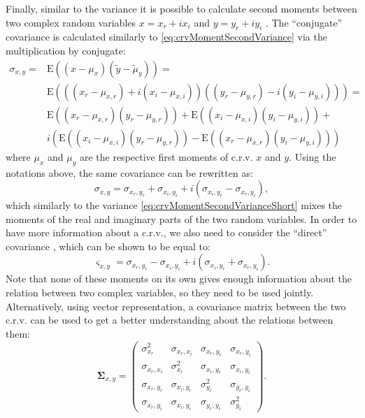 \documentclass[
]{book}
\begin{document}
Finally, similar to the variance it is possible to calculate second moments between two complex random variables \(x = x_r+i x_i\) and \(y = y_r + i y_i\) \citep{Picinbono}. The ``conjugate'' covariance is calculated similarly to \eqref{eq:crvMomentSecondVariance} via the multiplication by conjugate:
\begin{equation}
    \begin{aligned}
    \sigma_{x,y} = & \mathrm{E}((x-\mu_x) (\tilde{y}-\tilde{\mu}_y)) = \\
                   & \mathrm{E}\left(((x_r-\mu_{x,r}) + i (x_i-\mu_{x,i}))((y_r-\mu_{y,r}) - i (y_i-\mu_{y,i}))\right) = \\
                   & \mathrm{E}((x_r-\mu_{x,r})(y_r-\mu_{y,r})) + \mathrm{E}((x_i-\mu_{x,i})(y_i-\mu_{y,i})) + \\
                   & i \left(\mathrm{E}((x_i-\mu_{x,i})(y_r-\mu_{y,r})) - \mathrm{E}((x_r-\mu_{x,r})(y_i-\mu_{y,i}))\right)
    \end{aligned}
    \label{eq:crvMomentSecondCovariance}
\end{equation}
where \(\mu_{x}\) and \(\mu_y\) are the respective first moments of c.r.v. \(x\) and \(y\). Using the notations above, the same covariance can be rewritten as:
\begin{equation}
    \sigma_{x,y} = \sigma_{x_r, y_r} + \sigma_{x_i, y_i} + i (\sigma_{x_i, y_r} - \sigma_{x_r, y_i}),
    \label{eq:crvMomentSecondCovarianceShort}
\end{equation}
which similarly to the variance \eqref{eq:crvMomentSecondVarianceShort} mixes the moments of the real and imaginary parts of the two random variables. In order to have more information about a c.r.v., we also need to consider the ``direct'' covariance \citep[also known in the literature as pseudo-covariance,][]{reference}, which can be shown to be equal to:
\begin{equation}
    \varsigma_{x,y} = \sigma_{x_r, y_r} - \sigma_{x_i, y_i} + i (\sigma_{x_i, y_r} + \sigma_{x_r, y_i}).
    \label{eq:crvMomentSecondPseudoCovarianceShort}
\end{equation}
Note that none of these moments on its own gives enough information about the relation between two complex variables, so they need to be used jointly. Alternatively, using vector representation, a covariance matrix between the two c.r.v. can be used to get a better understanding about the relations between them:
\begin{equation}
    \boldsymbol{\Sigma}_{x,y} =
        \begin{pmatrix}
            \sigma_{x_r}^2 & \sigma_{x_r, x_i} & \sigma_{x_r, y_r} & \sigma_{x_r, y_i} \\
            \sigma_{x_r, x_i} & \sigma_{x_i}^2 & \sigma_{x_i, y_r} & \sigma_{x_i, y_i} \\
            \sigma_{x_r, y_r} & \sigma_{x_i, y_r} & \sigma_{y_r}^2 & \sigma_{y_r, y_i} \\
            \sigma_{x_r, y_i} & \sigma_{x_i, y_i} & \sigma_{y_r, y_i} & \sigma_{y_i}^2
        \end{pmatrix} .
    \label{eq:crvMomentSecondCoVarianceMatrix}
\end{equation}
\end{document}
